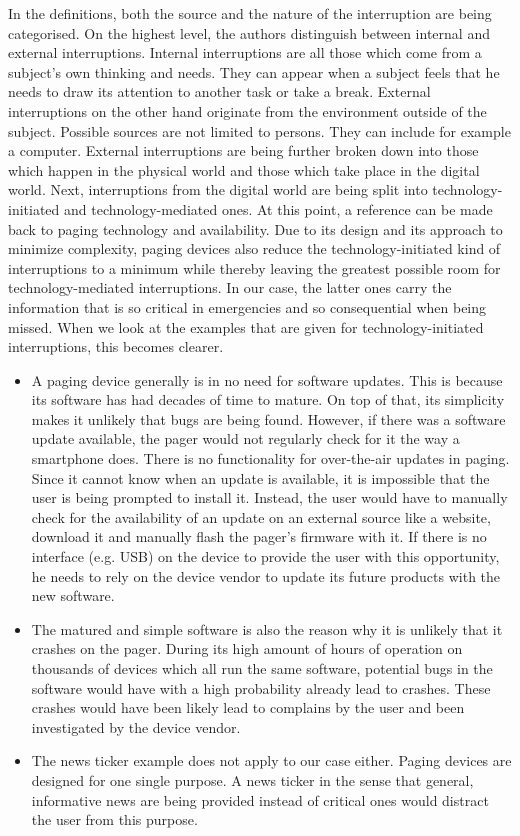 \documentclass{CML_Seminar_Template}
\begin{document}
In the definitions, both the source and the nature of the interruption are being categorised. On the highest level, the authors distinguish between internal and external interruptions. Internal interruptions are all those which come from a subject's own thinking and needs. They can appear when a subject feels that he needs to draw its attention to another task or take a break. External interruptions on the other hand originate from the environment outside of the subject. Possible sources are not limited to persons. They can include for example a computer. External interruptions are being further broken down into those which happen in the physical world and those which take place in the digital world. Next, interruptions from the digital world are being split into technology-initiated and technology-mediated ones. At this point, a reference can be made back to paging technology and availability. Due to its design and its approach to minimize complexity, paging devices also reduce the technology-initiated kind of interruptions to a minimum while thereby leaving the greatest possible room for technology-mediated interruptions. In our case, the latter ones carry the information that is so critical in emergencies and so consequential when being missed. When we look at the examples that are given for technology-initiated interruptions, this becomes clearer.
\begin{itemize}
	\item A paging device generally is in no need for software updates. This is because its software has had decades of time to mature. On top of that, its simplicity makes it unlikely that bugs are being found. However, if there was a software update available, the pager would not regularly check for it the way a smartphone does. There is no functionality for over-the-air updates in paging. Since it cannot know when an update is available, it is impossible that the user is being prompted to install it. Instead, the user would have to manually check for the availability of an update on an external source like a website, download it and manually flash the pager's firmware with it. If there is no interface (e.g. USB) on the device to provide the user with this opportunity, he needs to rely on the device vendor to update its future products with the new software.
	\item The matured and simple software is also the reason why it is unlikely that it crashes on the pager. During its high amount of hours of operation on thousands of devices which all run the same software, potential bugs in the software would have with a high probability already lead to crashes. These crashes would have been likely lead to complains by the user and been investigated by the device vendor.
	\item The news ticker example does not apply to our case either. Paging devices are designed for one single purpose. A news ticker in the sense that general, informative news are being provided instead of critical ones would distract the user from this purpose. 
\end{itemize}
\end{document}
